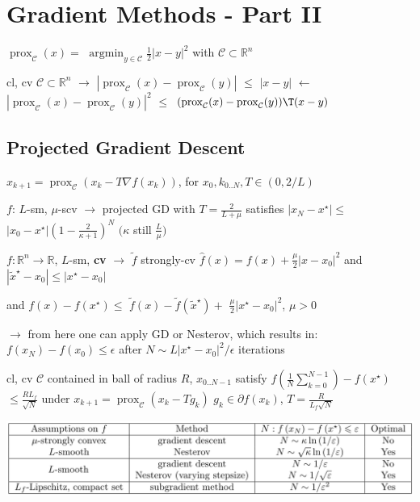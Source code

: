 \section{Gradient Methods - Part II}

\begin{definition}[]
	$\operatorname{prox}_\mathcal{C}(x)=$
	$\operatorname{argmin}_{y\in\mathcal{C}}\frac{1}{2}|x-y|^2$
	with $\mathcal{C}\subset \mathbb{R}^{n}$
\end{definition}

\begin{lemma}
	cl, cv
	$\mathcal{C}\subset \mathbb{R}^{n}$
	$\rightarrow$
	$|\operatorname{prox}_\mathcal{C}(x)-\operatorname{prox}_\mathcal{C}(y)|$
	$\le$
	$|x-y|$
	$\leftarrow$
	$|\operatorname{prox}_\mathcal{C}(x)-\operatorname{prox}_\mathcal{C}(y)|^2$
	$\le$
	$(\operatorname{prox}_\mathcal{C}(x)-\operatorname{prox}_\mathcal{C}(y))\T(x-y)$
\end{lemma}


\subsection{Projected Gradient Descent}

$x_{k+1}=\operatorname{prox}_\mathcal{C}(x_k-T\nabla f(x_k))$,
for $x_0,k_{0..N},T\in(0,2/L)$

\begin{proposition}
	$f$: $L$-sm, $\mu$-scv
	$\rightarrow$
	projected GD with
	$T=\frac{2}{L+\mu}$
	satisfies
	$|x_N - x^\star|\le$
	$|x_0 - x^\star|(1-\frac{2}{\kappa+1})^N$
	$(\kappa$ still $\frac{L}{\mu})$
\end{proposition}

\begin{lemma}
	$f:\mathbb{R}^{n}\rightarrow\mathbb{R}$, $L$-sm, \textbf{cv}
	$\rightarrow$
	$\tilde{f}$
	strongly-cv
	$\hat{f}(x) = f(x)+\frac{\mu}{2}|x-x_0|^2$
	and
	$|\tilde{x}^\star-x_0|\le|x^\star-x_0|$

	and
	$f(x)-f(x^\star)\le$
	$\tilde{f}(x)-\tilde{f}(\tilde{x}^\star)+$
	$\frac{\mu}{2}|x^\star-x_0|^2$,
	$\mu>0$
\end{lemma}

$\rightarrow$ from here one can apply GD or Nesterov, which results in:
$f(x_N)-f(x_0)\le\epsilon$
after
$N\sim L|x^\star-x_0|^2/\epsilon$
iterations

\begin{proposition}
	cl, cv $\mathcal{C}$
	contained in ball of radius $R$,
	$x_{0..N-1}$ satisfy
	$f(\frac{1}{N}\sum_{k=0}^{N-1})-f(x^\star)$
	$\le\frac{RL_f}{\sqrt{N}}$
	under
	$x_{k+1} = \operatorname{prox}_\mathcal{C}(x_k-Tg_k)$
	$g_k\in\partial f(x_k)$,
	$T = \frac{R}{L_f\sqrt{N}}$
\end{proposition}


\includegraphics[width=\columnwidth]{images/table-gd-methods.png}


